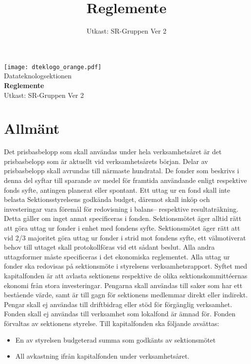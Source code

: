 \documentclass[a4paper]{dteklag}
\title{Reglemente}
\date{Utkast: SR-Gruppen Ver 2}
\begin{document}
\begin{titlepage}
  \thispagestyle{empty} %
  \vspace*{1cm}
  \begin{center}
    \texttt{[image: dteklogo\_orange.pdf]}\\[3em]
    {\Huge Datateknologsektionen}\\[3em]
    {\Huge \textbf{Reglemente}}\\[1em]
    Utkast: SR-Gruppen Ver 2
  \end{center}
\end{titlepage}

\makeheadfoot

\setcounter{tocdepth}{2}
\tableofcontents

\section{Allmänt}
\para[Ekonomi] Det prisbasbelopp som skall användas under hela verksamhetsåret är det prisbasbelopp som är aktuellt vid verksamhetsårets början.
\para Delar av prisbasbelopp skall avrundas till närmaste hundratal.
\para De fonder som beskrivs i denna del syftar till sparande av medel för framtida användande enligt respektive fonds syfte, antingen planerat eller spontant. Ett uttag ur en fond skall inte belasta Sektionsstyrelsens godkända budget, däremot skall inköp och investeringar vara föremål för redovisning i balans– respektive resultaträkning. Detta gäller om inget annat specificeras i fonden.
\para Sektionsmötet äger alltid rätt att göra uttag ur fonder i enhet med fondens syfte. Sektionsmötet äger rätt att vid 2/3 majoritet göra uttag ur fonder i strid mot fondens syfte, ett välmotiverat behov till uttaget skall protokollföras vid ett sådant beslut. Alla andra uttagsformer måste specificeras i det ekonomiska reglementet.
\para Alla uttag ur fonder ska redovisas på sektionsmöte i styrelsens verksamhetsrapport.
\para[Kapitalfonden] Syftet med kapitalfonden är att avlasta sektionens respektive de olika sektionskommittéernas ekonomi från stora investeringar. Pengarna skall användas till saker som har ett bestående värde, samt är till gagn för sektionens medlemmar direkt eller indirekt. Pengar skall ej användas till driftbidrag eller stöd för förgänglig verksamhet. Fonden skall ej användas till verksamhet som lokalfond är ämnad för.
\para Fonden förvaltas av sektionens styrelse.
\para Till kapitalfonden ska följande avsättas:
\begin{itemize}
\item En av styrelsen budgeterad summa som godkänts av sektionsmötet
\item All avkastning ifrån kapitalfonden under verksamhetsåret.
\end{itemize}
\end{document}
